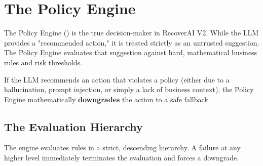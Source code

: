 
\section{The Policy Engine}

\begin{tcolorbox}[summarybox={\iconShield[1.5] Deterministic Business Logic}]
\color{textdark}
The Policy Engine () is the true decision-maker in RecoverAI V2. While the LLM provides a "recommended action," it is treated strictly as an untrusted suggestion. The Policy Engine evaluates that suggestion against hard, mathematical business rules and risk thresholds.

If the LLM recommends an action that violates a policy (either due to a hallucination, prompt injection, or simply a lack of business context), the Policy Engine mathematically \textbf{downgrades} the action to a safe fallback.
\end{tcolorbox}

\vspace{0.8cm}

\subsection{The Evaluation Hierarchy}

The engine evaluates rules in a strict, descending hierarchy. A failure at any higher level immediately terminates the evaluation and forces a downgrade.

